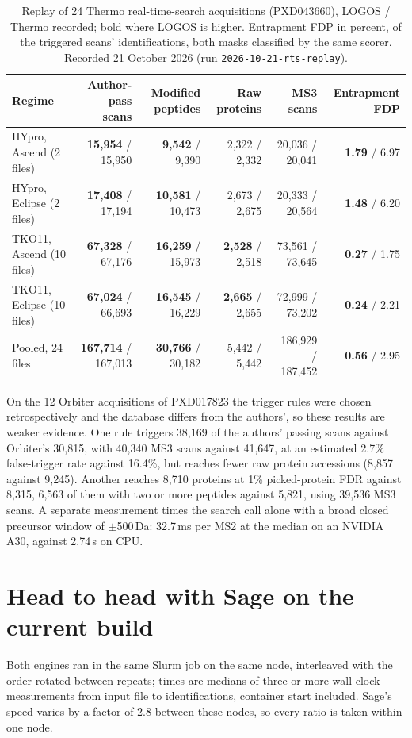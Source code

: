 \documentclass[10pt,a4paper]{article}
\begin{document}
\begin{table}[!htb]\centering
\caption{Replay of 24 Thermo real-time-search acquisitions (PXD043660), LOGOS / Thermo recorded; bold where LOGOS is higher. Entrapment FDP in percent, of the triggered scans' identifications, both masks classified by the same scorer. Recorded 21 October 2026 (run \texttt{2026-10-21-rts-replay}).}\label{tab:rtreplay}
\scriptsize\setlength{\tabcolsep}{3pt}
\begin{tabularx}{\linewidth}{@{}L r r r r r@{}}
\toprule
Regime & Author-pass scans & Modified peptides & Raw proteins & MS3 scans & Entrapment FDP\\
\midrule
{}HYpro, Ascend (2 files) & \textbf{15,954} / 15,950 & \textbf{9,542} / 9,390 & 2,322 / 2,332 & 20,036 / 20,041 & \textbf{1.79} / 6.97\\
HYpro, Eclipse (2 files) & \textbf{17,408} / 17,194 & \textbf{10,581} / 10,473 & 2,673 / 2,675 & 20,333 / 20,564 & \textbf{1.48} / 6.20\\
TKO11, Ascend (10 files) & \textbf{67,328} / 67,176 & \textbf{16,259} / 15,973 & \textbf{2,528} / 2,518 & 73,561 / 73,645 & \textbf{0.27} / 1.75\\
TKO11, Eclipse (10 files) & \textbf{67,024} / 66,693 & \textbf{16,545} / 16,229 & \textbf{2,665} / 2,655 & 72,999 / 73,202 & \textbf{0.24} / 2.21\\
Pooled, 24 files & \textbf{167,714} / 167,013 & \textbf{30,766} / 30,182 & 5,442 / 5,442 & 186,929 / 187,452 & \textbf{0.56} / 2.95\\
\bottomrule
\end{tabularx}
\end{table}

On the 12 Orbiter acquisitions of PXD017823 the trigger rules were chosen retrospectively and the database differs from the authors', so these results are weaker evidence. One rule triggers 38,169 of the authors' passing scans against Orbiter's 30,815, with 40,340 MS3 scans against 41,647, at an estimated 2.7\% false-trigger rate against 16.4\%, but reaches fewer raw protein accessions (8,857 against 9,245). Another reaches 8,710 proteins at 1\% picked-protein FDR against 8,315, 6,563 of them with two or more peptides against 5,821, using 39,536 MS3 scans. A separate measurement times the search call alone with a broad closed precursor window of $\pm$500\,Da: 32.7\,ms per MS2 at the median on an NVIDIA A30, against 2.74\,s on CPU.

\section{Head to head with Sage on the current build}\label{sec:sage}
Both engines ran in the same Slurm job on the same node, interleaved with the order rotated between repeats; times are medians of three or more wall-clock measurements from input file to identifications, container start included. Sage's speed varies by a factor of 2.8 between these nodes, so every ratio is taken within one node.
\end{document}
